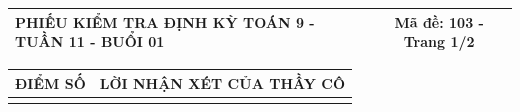 \documentclass[12pt,a4paper]{article}
\begin{document}
\newpage
\noindent
\begin{tabularx}{\linewidth}{|X|c|}
\hline
\textbf{PHIẾU KIỂM TRA ĐỊNH KỲ TOÁN 9 - TUẦN 11 - BUỔI 01} & \textbf{Mã đề: 103 - Trang 1/2} \\
\hline
\end{tabularx}

\vspace{1.0mm}

\noindent
\begin{tabularx}{\linewidth}{|p{3.2cm}|X|}
\hline
\centering\textbf{ĐIỂM SỐ} & \centering\textbf{LỜI NHẬN XÉT CỦA THẦY CÔ} \tabularnewline
\hline
\rule{0pt}{1.8cm} & \tabularnewline
\hline
\end{tabularx}
\end{document}
